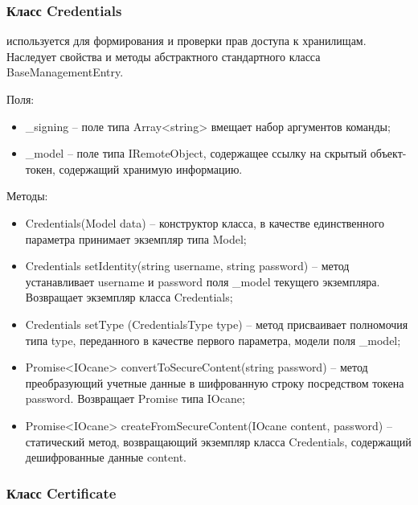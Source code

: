 \subsubsection{Класс Credentials }
\label{sub:arch_and_mod:probab_net:credentials}

используется для формирования и проверки прав доступа к хранилищам. Наследует свойства и методы абстрактного стандартного класса BaseManagementEntry.

Поля:
\begin{itemize}
  \item \_signing – поле типа Array<string> вмещает набор аргументов команды;
  \item \_model – поле типа IRemoteObject, содержащее ссылку на скрытый объект-токен, содержащий хранимую информацию.
\end{itemize}

Методы:
\begin{itemize}
  \item Credentials(Model data) – конструктор класса, в качестве единственного параметра принимает экземпляр типа Model;
  \item Credentials setIdentity(string username, string password) – метод устанавливает username и password поля \_model текущего экземпляра. Возвращает экземпляр класса Credentials;
  \item Credentials setType (CredentialsType type) – метод присваивает полномочия типа type, переданного в качестве первого параметра, модели поля \_model;
  \item Promise<IOcane> convertToSecureContent(string password) – метод преобразующий учетные данные в шифрованную строку посредством токена password. Возвращает Promise типа IOcane;
  \item Promise<IOcane> createFromSecureContent(IOcane content, password) – статический метод, возвращающий экземпляр класса Credentials, содержащий дешифрованные данные content.
\end{itemize}

\subsubsection{Класс Certificate }
\label{sub:arch_and_mod:probab_net:certificate}

